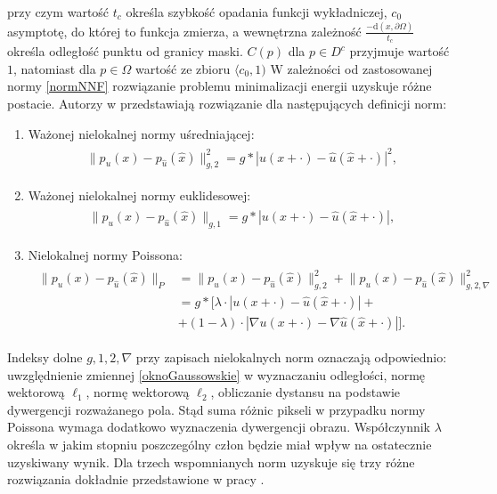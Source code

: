 \documentclass[12pt, twoside, openany]{report}
\theoremstyle{definition}
\begin{document}
przy czym wartość $t_c$ określa szybkość opadania funkcji wykładniczej, $c_0$ asymptotę, do której to funkcja zmierza, a wewnętrzna zależność $\frac{-\mathrm{d}(x,\partial\Omega)}{t_c}$ określa odległość punktu od granicy maski. $C(p)$ dla $p \in D^c$ przyjmuje wartość $1$, natomiast dla $p \in \Omega$ wartość ze zbioru $\langle c_0,1)$ W zależności od zastosowanej normy \eqref{normNNF} rozwiązanie problemu minimalizacji energii uzyskuje różne postacie. Autorzy w \cite{arias2011variational} przedstawiają rozwiązanie dla następujących definicji norm:
\begin{enumerate}
\item
Ważonej nielokalnej normy uśredniającej:
\begin{align}
\begin{aligned}
\big\| p_{u}(x) - p_{\hat{u}}(\hat{x}) \big\|^{2}_{g,2} = g \ast | u(x+\cdot) - \hat{u}(\hat{x}+\cdot) |^2,
\label{nonLocalMeans}
\end{aligned}
\end{align}
\item
Ważonej nielokalnej normy euklidesowej:
\begin{align}
\begin{aligned}
\big\| p_{u}(x) - p_{\hat{u}}(\hat{x}) \big\|_{g,1} = g \ast | u(x+\cdot) - \hat{u}(\hat{x}+\cdot)|,
\label{nonLocalMedians}
\end{aligned}
\end{align}
\item
Nielokalnej normy Poissona:
\begin{align}
\begin{aligned}
\big\| p_{u}(x) - p_{\hat{u}}(\hat{x}) \big\|_{P} &= \big\| p_{u}(x) - p_{\hat{u}}(\hat{x}) \big\|^{2}_{g,2} + \big\| p_{u}(x) - p_{\hat{u}}(\hat{x}) \big\|^{2}_{g,2,\nabla} \\
&= g \ast \Big[\lambda \cdot | u(x+\cdot) - \hat{u}(\hat{x}+\cdot) | + \\
&+ (1-\lambda)\cdot |\nabla u(x+\cdot) - \nabla \hat{u}(\hat{x}+\cdot)|\Big].
\label{nonLocalpoisson}
\end{aligned}
\end{align}
\end{enumerate}
Indeksy dolne $g, 1, 2, \nabla$ przy zapisach nielokalnych norm oznaczają odpowiednio: uwzględnienie zmiennej \eqref{oknoGaussowskie} w wyznaczaniu odległości, normę wektorową $\ell_{1}$, normę wektorową $\ell_{2}$, obliczanie dystansu na podstawie dywergencji rozważanego pola. Stąd suma różnic pikseli w przypadku normy Poissona wymaga dodatkowo wyznaczenia dywergencji obrazu. Współczynnik $\lambda$ określa w jakim stopniu poszczególny człon będzie miał wpływ na ostatecznie uzyskiwany wynik. Dla trzech wspomnianych norm uzyskuje się trzy różne rozwiązania dokładnie przedstawione w pracy \cite{arias2011variational}.
\end{document}
